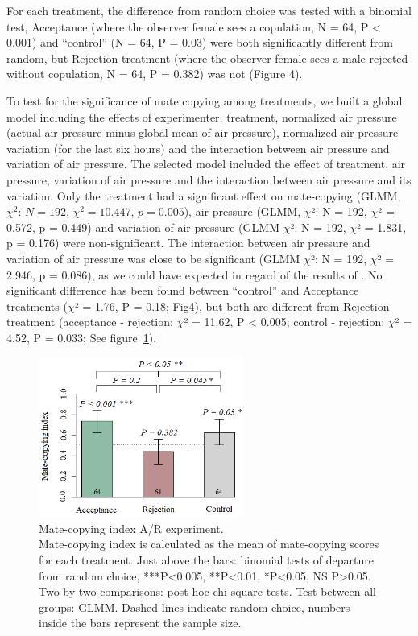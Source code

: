 \documentclass[a4paper, 12pt]{article}
\begin{document}
	For each treatment, the difference from random choice was tested with a binomial test, Acceptance (where the observer female sees a copulation, N = 64, P {\textless} 0.001) and ``control'' (N = 64, P = 0.03) were both significantly different from random, but Rejection treatment (where the observer female sees a male rejected without copulation, N = 64, P = 0.382) was not (Figure 4).

	To test for the significance of mate copying among treatments, we built a global model including the effects of experimenter, treatment, normalized air pressure (actual air pressure minus global mean of air pressure), normalized air pressure variation (for the last six hours) and the interaction between air pressure and variation of air pressure. The selected model included the effect of treatment, air pressure, variation of air pressure and the interaction between air pressure and its variation. Only the treatment had a significant effect on mate-copying (GLMM, $\chi^2$: $N = 192$, $\chi^2 = 10.447$, $p = 0.005$), air pressure (GLMM, $\chi $²: N = 192, $\chi $² = 0.572, p = 0.449) and variation of air pressure (GLMM $\chi $²: N = 192, $\chi $² = 1.831, p = 0.176) were non-significant. The interaction between air pressure and variation of air pressure was close to be significant (GLMM $\chi $²: N = 192, $\chi $² = 2.946, p = 0.086), as we could have expected in regard of the results of \textcite{dagaeff_drosophila_2016}. No significant difference has been found between ``control'' and Acceptance treatments ($\chi $² = 1.76, P = 0.18; Fig4), but both are different from Rejection treatment (acceptance - rejection: $\chi $² = 11.62, P {\textless} 0.005; control - rejection: $\chi $² = 4.52, P = 0.033; See figure~\ref{fig:mcsar}).
	

		\begin{figure}
		\centering
		\includegraphics[width=0.6\textwidth]{images/mcsar}
		\caption{Mate-copying index A/R experiment.\\
			 Mate-copying index is calculated as the mean of mate-copying scores for each treatment. Just above the bars: binomial tests of departure from random choice, ***P<0.005, **P<0.01, *P<0.05, NS P>0.05. Two by two comparisons: post-hoc chi-square tests. Test between all groups: GLMM. Dashed lines indicate random choice, numbers inside the bars represent the sample size.}
		\label{fig:mcsar}
	\end{figure}
\end{document}
